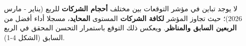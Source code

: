 لا يوجد تباين في مؤشر التوقعات بين مختلف \textbf{أحجام الشركات} للربع (يناير - مارس 2026)؛ حيث تجاوز المؤشر \textbf{لكافة الشركات} المستوى \textbf{المحايد}، مسجلا أداء أفضل من \textbf{الربعين السابق والمناظر}. ويعكس ذلك التوقع باستمرار التحسن المحقق في الربع السابق (الشكل 4-1).
